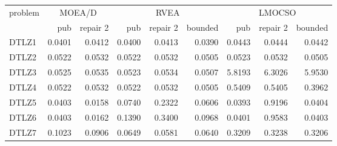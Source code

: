 \scriptsize
\setlength{\tabcolsep}{3.5pt}
\begin{tabular}{lrrrrrrrr}
\toprule
problem & \multicolumn{2}{c}{MOEA/D} & \multicolumn{3}{c}{RVEA} & \multicolumn{3}{c}{LMOCSO} \\
\cmidrule(lr){2-3}\cmidrule(lr){4-6}\cmidrule(lr){7-9}
 & pub & repair 2 & pub & repair 2 & bounded & pub & repair 2 & bounded \\
\midrule
DTLZ1 & 0.0401 & 0.0412 & 0.0400 & 0.0413 & 0.0390 & 0.0443 & 0.0444 & 0.0442 \\
DTLZ2 & 0.0522 & 0.0532 & 0.0522 & 0.0532 & 0.0505 & 0.0523 & 0.0532 & 0.0505 \\
DTLZ3 & 0.0525 & 0.0535 & 0.0523 & 0.0534 & 0.0507 & 5.8193 & 6.3026 & 5.9530 \\
DTLZ4 & 0.0522 & 0.0532 & 0.0522 & 0.0532 & 0.0505 & 0.5409 & 0.5405 & 0.3962 \\
DTLZ5 & 0.0403 & 0.0158 & 0.0740 & 0.2322 & 0.0606 & 0.0393 & 0.9196 & 0.0404 \\
DTLZ6 & 0.0403 & 0.0162 & 0.1390 & 0.3400 & 0.0968 & 0.0401 & 0.9583 & 0.0403 \\
DTLZ7 & 0.1023 & 0.0906 & 0.0649 & 0.0581 & 0.0640 & 0.3209 & 0.3238 & 0.3206 \\
\bottomrule
\end{tabular}
